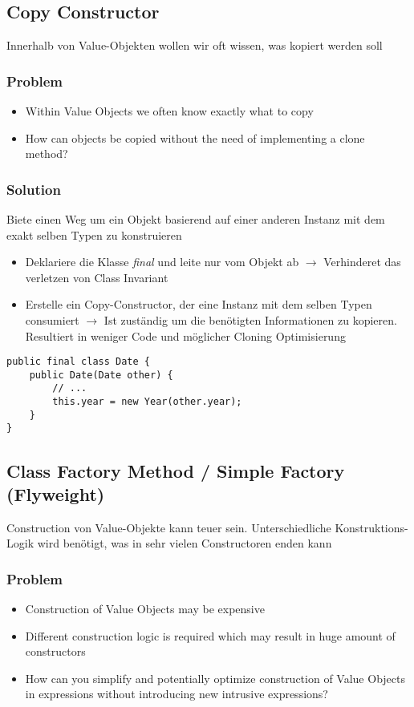 \subsection{Copy Constructor}

Innerhalb von Value-Objekten wollen wir oft wissen, was kopiert werden soll

\subsubsection{Problem}
\begin{itemize}
    \item Within Value Objects we often know exactly what to copy
    \item How can objects be copied without the need of implementing a clone method?
\end{itemize}

\subsubsection{Solution}
Biete einen Weg um ein Objekt basierend auf einer anderen Instanz mit dem exakt selben Typen zu konstruieren

\begin{itemize}
    \item Deklariere die Klasse \textit{final} und leite nur vom Objekt ab $\rightarrow$ Verhinderet das verletzen von Class Invariant
    \item Erstelle ein Copy-Constructor, der eine Instanz mit dem selben Typen consumiert $\rightarrow$ Ist zuständig um die benötigten Informationen zu kopieren. Resultiert in weniger Code und möglicher Cloning Optimisierung
\end{itemize}
\begin{lstlisting}
public final class Date {
    public Date(Date other) {
        // ...
        this.year = new Year(other.year);
    }
}
\end{lstlisting}

\subsection{Class Factory Method / Simple Factory (Flyweight)}

Construction von Value-Objekte kann teuer sein. Unterschiedliche Konstruktions-Logik wird benötigt, was in sehr vielen Constructoren enden kann

\subsubsection{Problem}
\begin{itemize}
    \item Construction of Value Objects may be expensive
    \item Different construction logic is required which may result in huge amount of constructors
    \item How can you simplify and potentially optimize construction of Value Objects in expressions without introducing new intrusive expressions?
\end{itemize}

